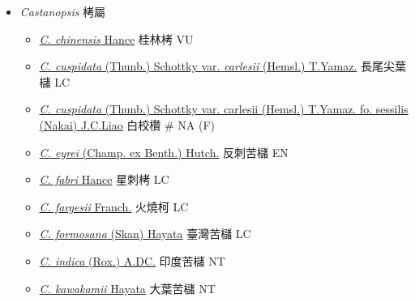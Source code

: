 
  \begin{itemize}
 \item[] \textit{Castanopsis} 栲屬
                                
  \begin{itemize}
        \item[] \href{http://www.theplantlist.org/tpl1.1/search?q=Castanopsis+chinensis}{\textit{C. chinensis} Hance}   桂林栲   VU
        \item[] \href{http://www.theplantlist.org/tpl1.1/search?q=Castanopsis+cuspidata+var.+carlesii}{\textit{C. cuspidata} (Thunb.) Schottky var. \textit{carlesii} (Hemsl.) T.Yamaz.}   長尾尖葉櫧   LC
        \item[] \href{http://www.theplantlist.org/tpl1.1/search?q=Castanopsis+cuspidata+var.+carlesii+fo.+sessilis}{\textit{C. cuspidata} (Thunb.) Schottky var. carlesii (Hemsl.) T.Yamaz. fo. sessilis (Nakai) J.C.Liao}   白校欑  \# NA (F)
        \item[] \href{http://www.theplantlist.org/tpl1.1/search?q=Castanopsis+eyrei}{\textit{C. eyrei} (Champ. ex Benth.) Hutch.}   反刺苦櫧   EN
        \item[] \href{http://www.theplantlist.org/tpl1.1/search?q=Castanopsis+fabri}{\textit{C. fabri} Hance}   星刺栲   LC
        \item[] \href{http://www.theplantlist.org/tpl1.1/search?q=Castanopsis+fargesii}{\textit{C. fargesii} Franch.}   火燒柯   LC
        \item[] \href{http://www.theplantlist.org/tpl1.1/search?q=Castanopsis+formosana}{\textit{C. formosana} (Skan) Hayata}   臺灣苦櫧   LC
        \item[] \href{http://www.theplantlist.org/tpl1.1/search?q=Castanopsis+indica}{\textit{C. indica} (Rox.) A.DC.}   印度苦櫧   NT
        \item[] \href{http://www.theplantlist.org/tpl1.1/search?q=Castanopsis+kawakamii}{\textit{C. kawakamii} Hayata}   大葉苦櫧   NT

\end{itemize}
\end{itemize}
